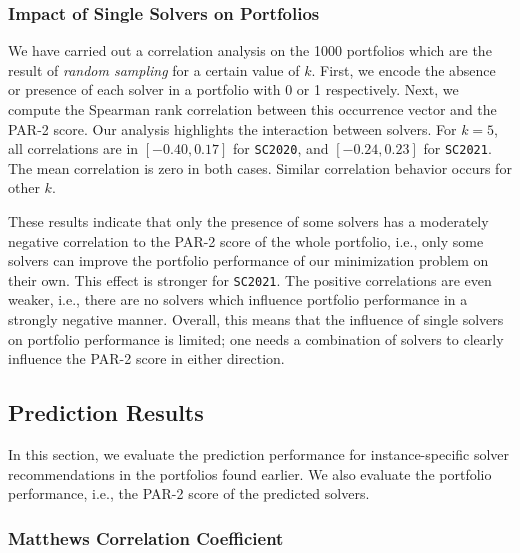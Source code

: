 \documentclass[conference]{IEEEtran}
\begin{document}
\subsubsection{Impact of Single Solvers on Portfolios}

We have carried out a correlation analysis on the 1000 portfolios which are the result of \emph{random sampling} for a certain value of $k$. 
First, we encode the absence or presence of each solver in a portfolio with 0 or 1 respectively.
Next, we compute the Spearman rank correlation between this occurrence vector and the PAR-2 score.
Our analysis highlights the interaction between solvers. 
For $k=5$, all correlations are in $[-0.40,0.17]$ for \texttt{SC2020}, and $[-0.24,0.23]$ for \texttt{SC2021}.
The mean correlation is zero in both cases.
Similar correlation behavior occurs for other $k$.

These results indicate that only the presence of some solvers has a moderately negative correlation to the PAR-2 score of the whole portfolio, i.e., only some solvers can improve the portfolio performance of our minimization problem on their own.
This effect is stronger for \texttt{SC2021}.
The positive correlations are even weaker, i.e., there are no solvers which influence portfolio performance in a strongly negative manner.
Overall, this means that the influence of single solvers on portfolio performance is limited; one needs a combination of solvers to clearly influence the PAR-2 score in either direction.

\subsection{Prediction Results}

In this section, we evaluate the prediction performance for instance-specific solver recommendations in the portfolios found earlier. 
We also evaluate the portfolio performance, i.e., the PAR-2 score of the predicted solvers.

\subsubsection{Matthews Correlation Coefficient}
\end{document}

